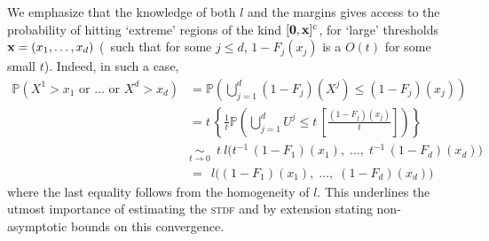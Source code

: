 We emphasize that the knowledge of both $l$ and the margins gives
access to the probability of hitting `extreme' regions of the kind
$[\mathbf 0, \mathbf x]^c$, for  `large' thresholds 
$\mathbf x = (x_1,\ldots,x_d)$ (\ie~such that for some $ j \le d$, $ 1-F_j(x_j) $ is   a
$O(t)$   for some small
$t$). Indeed, in such a case, 
\begin{align*}
\mathbb{P}(X^1>x_1 \text{ or } \ldots \text{ or } X^d>x_d) 
&= \mathbb{P}\left(\bigcup_{j=1}^d (1-F_j)(X^j) \le (1-F_j)(x_j)
\right)  \\
&= t \, \left\{\frac{1}{t}\mathbb{P}\left(\bigcup_{j=1}^d U^j \le t\,
    \left[\frac{ (1-F_j)(x_j)}{t}  \right]
\right)\right\} \\
&\underset{t\to 0}{\sim} \; ~t ~l\Big( t^{-1}\,(1-F_1)(x_1),\;  \ldots, \;  t^{-1}\, (1-F_d)(x_d) \Big)  \\
&=  ~~l\Big((1-F_1)(x_1), \;\ldots,\; (1-F_d)(x_d) \Big)     
\end{align*}
where the  last equality follows from the homogeneity of $l$.
  This underlines the utmost importance of estimating the \textsc{stdf} and
by extension stating non-asymptotic bounds on this convergence.


\noindent

